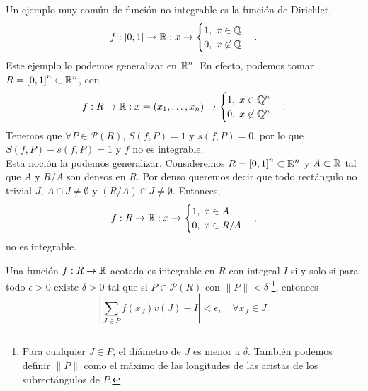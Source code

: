 \begin{eg}
Un ejemplo muy común de función no integrable es la función de Dirichlet,
\[f:\left[0,1\right]  \to \mathbb{R} : x \to 
\begin{cases}
1, \; x \in \mathbb{Q} \\
0, \; x \not\in \mathbb{Q}
\end{cases}
.\]
Este ejemplo lo podemos generalizar en $\displaystyle \mathbb{R}^{n} $. En efecto, podemos tomar $\displaystyle R = \left[0,1\right] ^{n} \subset \mathbb{R}^{n} $, con 
\[f:R \to \mathbb{R} : x = \left(x_{1}, \ldots, x_{n}\right) \to 
\begin{cases}
1, \; x \in \mathbb{Q}^{n} \\
0, \; x\not\in \mathbb{Q}^{n}
\end{cases}
.\]
Tenemos que $\displaystyle \forall P \in \mathcal{P}\left(R\right) $, $\displaystyle S\left(f,P\right) = 1 $ y $\displaystyle s\left(f,P\right) = 0 $, por lo que $\displaystyle S\left(f,P\right) -s\left(f,P\right) = 1 $ y $\displaystyle f $ no es integrable. \\
Esta noción la podemos generalizar. Consideremos $\displaystyle R = \left[0,1\right] ^{n} \subset \mathbb{R}^{n} $ y $\displaystyle A \subset \mathbb{R} $ tal que $\displaystyle A $ y $\displaystyle R/A $ son densos en $\displaystyle R $. Por denso queremos decir que todo rectángulo no trivial $\displaystyle J $, $\displaystyle A \cap J \neq \emptyset $ y $\displaystyle \left(R/A\right)\cap J \neq \emptyset $. Entonces, 
\[f : R \to \mathbb{R} : x \to 
\begin{cases}
1, \; x \in A \\
0, \; x \in R/A
\end{cases}
,\]
no es integrable. 
\end{eg}
\begin{theorem}
Una función $\displaystyle f : R \to \mathbb{R} $ acotada es integrable en $\displaystyle R $ con integral $\displaystyle I $ si y solo si para todo $\displaystyle \epsilon > 0 $ existe $\displaystyle \delta > 0 $ tal que si $\displaystyle P \in \mathcal{P}\left(R\right) $ con $\displaystyle \|P\|<\delta  $ \footnote{Para cualquier $\displaystyle J \in P $, el diámetro de $\displaystyle J $ es menor a $\displaystyle \delta  $. También podemos definir $\displaystyle \|P\| $ como el máximo de las longitudes de las aristas de los subrectángulos de $\displaystyle P $. }, entonces
\[ \left|\sum_{J \in P}f\left(x_{J}\right)v\left(J\right) - I\right|< \epsilon , \quad \forall x_{J} \in J .\]
\end{theorem}
